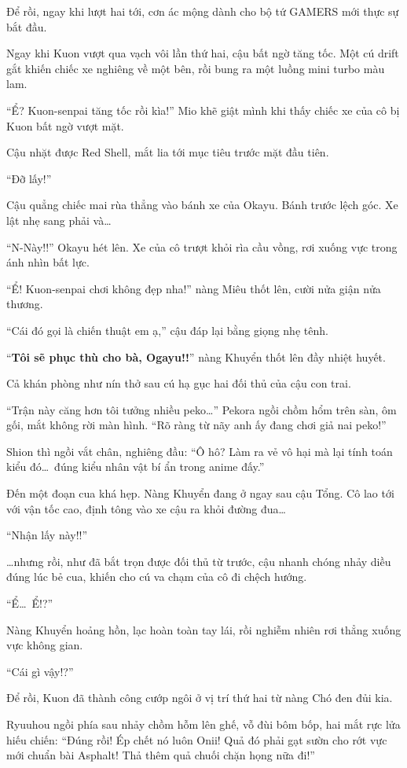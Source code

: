 \documentclass[../main.tex]{subfiles}
\begin{document}
Để rồi, ngay khi lượt hai tới, cơn ác mộng dành cho bộ tứ GAMERS mới thực sự bắt đầu.

Ngay khi Kuon vượt qua vạch vôi lần thứ hai, cậu bất ngờ tăng tốc. Một cú drift gắt khiến chiếc xe nghiêng về một bên, rồi bung ra một luồng mini turbo màu lam.

``Ể? Kuon-senpai tăng tốc rồi kìa!'' Mio khẽ giật mình khi thấy chiếc xe của cô bị Kuon bất ngờ vượt mặt.

Cậu nhặt được Red Shell, mắt lia tới mục tiêu trước mặt đầu tiên.

``Đỡ lấy!''

Cậu quẳng chiếc mai rùa thẳng vào bánh xe của Okayu. Bánh trước lệch góc. Xe lật nhẹ sang phải và\dots

``N-Này!!'' Okayu hét lên. Xe của cô trượt khỏi rìa cầu vồng, rơi xuống vực trong ánh nhìn bất lực.

``Ể! Kuon-senpai chơi không đẹp nha!'' nàng Miêu thốt lên, cười nửa giận nửa thương.

``Cái đó gọi là chiến thuật em ạ,'' cậu đáp lại bằng giọng nhẹ tênh.

``\textbf{Tôi sẽ phục thù cho bà, Ogayu!!}'' nàng Khuyển thốt lên đầy nhiệt huyết.

Cả khán phòng như nín thở sau cú hạ gục hai đối thủ của cậu con trai.

``Trận này căng hơn tôi tưởng nhiều peko\dots'' Pekora ngồi chồm hổm trên sàn, ôm gối, mắt không rời màn hình. ``Rõ ràng từ nãy anh ấy đang chơi giả nai peko!''

Shion thì ngồi vắt chân, nghiêng đầu: ``Ô hô? Làm ra vẻ vô hại mà lại tính toán kiểu đó\dots\ đúng kiểu nhân vật bí ẩn trong anime đấy.''

Đến một đoạn cua khá hẹp. Nàng Khuyển đang ở ngay sau cậu Tổng. Cô lao tới với vận tốc cao, định tông vào xe cậu ra khỏi đường đua\dots

``Nhận lấy này!!''

\dots nhưng rồi, như đã bắt trọn được đối thủ từ trước, cậu nhanh chóng nhảy diều đúng lúc bẻ cua, khiến cho cú va chạm của cô đi chệch hướng.

``Ể\dots\ Ể!?''

Nàng Khuyển hoảng hồn, lạc hoàn toàn tay lái, rồi nghiễm nhiên rơi thẳng xuống vực không gian.

``Cái gì vậy!?''

Để rồi, Kuon đã thành công cướp ngôi ở vị trí thứ hai từ nàng Chó đen đủi kia.

Ryuuhou ngồi phía sau nhảy chồm hỗm lên ghế, vỗ đùi bôm bốp, hai mắt rực lửa hiếu chiến: ``Đúng rồi! Ép chết nó luôn Onii! Quả đó phải gạt sườn cho rớt vực mới chuẩn bài Asphalt! Thả thêm quả chuối chặn họng nữa đi!''
\end{document}
